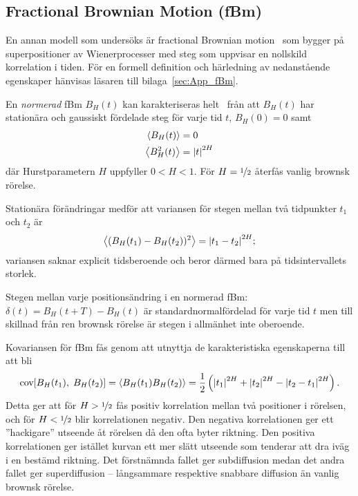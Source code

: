 

\subsection{Fractional Brownian Motion (fBm)}

En annan modell som undersöks är fractional Brownian motion~\cite{Mandelbrot_fBm1968} som bygger på superpositioner av Wienerprocesser med steg som uppvisar en nollskild korrelation i tiden. För en formell definition och härledning av nedanstående egenskaper hänvisas läsaren till bilaga~\ref{sec:App_fBm}.

En \emph{normerad} fBm $B_H(t)$ kan karakteriseras helt~\cite{Dieker_fBm} från att $B_H(t)$ har stationära och gaussiskt fördelade steg för varje tid $t$, $B_H(0)=0$ samt
\begin{equation}
\begin{aligned}
    \ev{B_H(t)}&=0 \\
    \ev{B^2_H(t)}&=\abs{t}^{2H}
\end{aligned}
\end{equation}
där Hurstparametern $H$ uppfyller $0< H <1$. För $H=\nicefrac{1}{2}$ återfås vanlig brownsk rörelse. 

Stationära förändringar medför att variansen för stegen mellan två tidpunkter $t_1$ och $t_2$ är
\begin{equation} \label{eq:fBm_MSD}
    \ev{(B_H(t_1)-B_H(t_2))^2} = \abs{t_1-t_2}^{2H};
\end{equation}
variansen saknar explicit tidsberoende och beror därmed bara på tidsintervallets storlek. 

Stegen mellan varje positionsändring i en normerad fBm:  $\delta(t)=B_H(t+T)-B_H(t)$ är standardnormalfördelad för varje tid $t$ men till skillnad från ren brownsk rörelse är stegen i allmänhet inte oberoende.

Kovariansen för fBm fås genom att utnyttja de karakteristiska egenskaperna till att bli
\begin{equation} %
\COV{B_H(t_1)}{B_H(t_2)}=\ev{B_H(t_1)B_H(t_2)}
= \frac{1}{2} 
\left(\abs{t_1}^{2H}+\abs{t_2}^{2H}-\abs{t_2-t_1}^{2H}\right).
\end{equation}
Detta ger att för $H>\nicefrac{1}{2}$ fås positiv korrelation mellan två positioner i rörelsen, och för $H<\nicefrac{1}{2}$ blir korrelationen negativ. Den negativa korrelationen ger ett ''hackigare'' utseende åt rörelsen då den ofta byter riktning. Den positiva korrelationen ger istället kurvan ett mer slätt utseende som tenderar att dra iväg i en bestämd riktning. Det förstnämnda fallet ger subdiffusion medan det andra fallet ger superdiffusion -- långsammare respektive snabbare diffusion än vanlig brownsk rörelse. 


